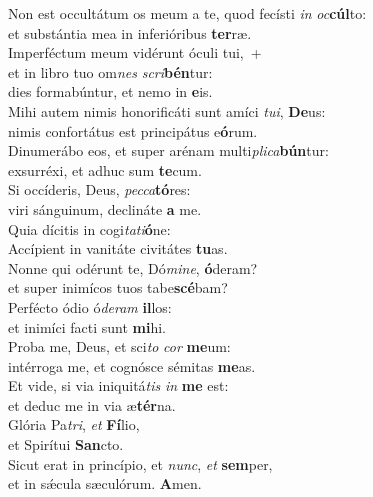 \evenverse Non est occultátum os meum a te, quod fecísti \textit{in} \textit{oc}\textbf{cúl}to:~\*\\
\evenverse et substántia mea in inferióribus \textbf{ter}ræ.\\
\oddverse Imperféctum meum vidérunt óculi tui,~+\\
\oddverse  et in libro tuo om\textit{nes} \textit{scri}\textbf{bén}tur:~\*\\
\oddverse dies formabúntur, et nemo in \textbf{e}is.\\
\evenverse Mihi autem nimis honorificáti sunt amíci \textit{tu}\textit{i}, \textbf{De}us:~\*\\
\evenverse nimis confortátus est principátus e\textbf{ó}rum.\\
\oddverse Dinumerábo eos, et super arénam multi\textit{pli}\textit{ca}\textbf{bún}tur:~\*\\
\oddverse exsurréxi, et adhuc sum \textbf{te}cum.\\
\evenverse Si occíderis, Deus, \textit{pec}\textit{ca}\textbf{tó}res:~\*\\
\evenverse viri sánguinum, declináte \textbf{a} me.\\
\oddverse Quia dícitis in cogi\textit{ta}\textit{ti}\textbf{ó}ne:~\*\\
\oddverse Accípient in vanitáte civitátes \textbf{tu}as.\\
\evenverse Nonne qui odérunt te, Dó\textit{mi}\textit{ne}, \textbf{ó}deram?~\*\\
\evenverse et super inimícos tuos tabe\textbf{scé}bam?\\
\oddverse Perfécto ódio ó\textit{de}\textit{ram} \textbf{il}los:~\*\\
\oddverse et inimíci facti sunt \textbf{mi}hi.\\
\evenverse Proba me, Deus, et sci\textit{to} \textit{cor} \textbf{me}um:~\*\\
\evenverse intérroga me, et cognósce sémitas \textbf{me}as.\\
\oddverse Et vide, si via iniquitá\textit{tis} \textit{in} \textbf{me} est:~\*\\
\oddverse et deduc me in via æ\textbf{tér}na.\\
\evenverse Glória Pa\textit{tri}, \textit{et} \textbf{Fí}lio,~\*\\
\evenverse et Spirítui \textbf{San}cto.\\
\oddverse Sicut erat in princípio, et \textit{nunc}, \textit{et} \textbf{sem}per,~\*\\
\oddverse et in sǽcula sæculórum. \textbf{A}men.\\
